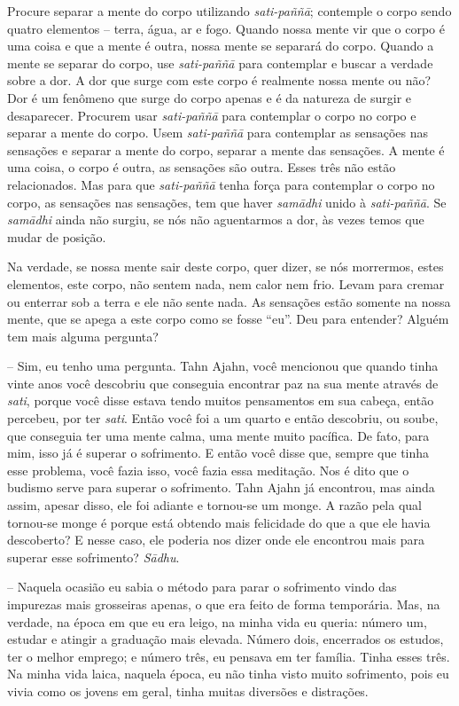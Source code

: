 Procure separar a mente do corpo utilizando \textit{sati-paññā};
contemple o corpo sendo quatro elementos – terra, água, ar e fogo.
Quando nossa mente vir que o corpo é uma coisa e que a mente é outra,
nossa mente se separará do corpo. Quando a mente se separar do corpo,
use \textit{sati-paññā} para contemplar e buscar a verdade sobre a
dor. A dor que surge com este corpo é realmente nossa mente ou não? Dor
é um fenômeno que surge do corpo apenas e é da natureza de surgir e
desaparecer. Procurem usar \textit{sati-paññā} para contemplar o
corpo no corpo e separar a mente do corpo. Usem \textit{sati-paññā
}para contemplar as sensações nas sensações e separar a mente do corpo,
separar a mente das sensações. A mente é uma coisa, o corpo é outra, as
sensações são outra. Esses três não estão relacionados. Mas para que
\textit{sati-paññā} tenha força para contemplar o corpo no corpo, as
sensações nas sensações, tem que haver \textit{samādhi} unido à
\textit{sati-paññā}. Se \textit{samādhi} ainda não surgiu, se nós
não aguentarmos a dor, às vezes temos que mudar de posição.

Na verdade, se nossa mente sair deste corpo, quer dizer, se nós
morrermos, estes elementos, este corpo, não sentem nada, nem calor nem
frio. Levam para cremar ou enterrar sob a terra e ele não sente nada.
As sensações estão somente na nossa mente, que se apega a este corpo
como se fosse “eu”. Deu para entender? Alguém tem mais alguma pergunta?

-- Sim, eu tenho uma pergunta. Tahn Ajahn, você mencionou que
quando tinha vinte anos você descobriu que conseguia encontrar paz na
sua mente através de \textit{sati}, porque você disse estava tendo
muitos pensamentos em sua cabeça, então percebeu, por ter
\textit{sati}. Então você foi a um quarto e então descobriu, ou soube,
que conseguia ter uma mente calma, uma mente muito pacífica. De fato,
para mim, isso já é superar o sofrimento. E então você disse que,
sempre que tinha esse problema, você fazia isso, você fazia essa
meditação. Nos é dito que o budismo serve para superar o sofrimento.
Tahn Ajahn já encontrou, mas ainda assim, apesar disso, ele
foi adiante e tornou-se um monge. A razão pela qual tornou-se monge é
porque está obtendo mais felicidade do que a que ele havia descoberto?
E nesse caso, ele poderia nos dizer onde ele encontrou mais para
superar esse sofrimento? \textit{Sādhu}.

-- Naquela ocasião eu sabia o método para parar o sofrimento vindo
das impurezas mais grosseiras apenas, o que era feito de forma
temporária. Mas, na verdade, na época em que eu era leigo, na minha
vida eu queria: número um, estudar e atingir a graduação mais elevada.
Número dois, encerrados os estudos, ter o melhor emprego; e número
três, eu pensava em ter família. Tinha esses três. Na minha vida laica,
naquela época, eu não tinha visto muito sofrimento, pois eu vivia como
os jovens em geral, tinha muitas diversões e distrações.

